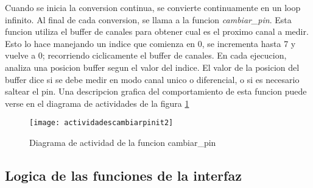 Cuando se inicia la conversion continua, se convierte continuamente en un loop infinito. Al final de cada conversion, se llama a la funcion \textit{cambiar\_pin}. Esta funcion utiliza el buffer de canales para obtener cual es el proximo canal a medir. Esto lo hace manejando un indice que comienza en 0, se incrementa hasta 7 y vuelve a 0; recorriendo ciclicamente el buffer de canales. 
En cada ejecucion, analiza una posicion buffer segun el valor del indice. El valor de la posicion del buffer dice si se debe medir en modo canal unico o diferencial, o si es necesario saltear el pin. Una descripcion grafica del comportamiento de esta funcion puede verse en el diagrama de actividades de la figura \ref{fig:actividadescambiarpinit2} \\


\begin{figure}[h]
  \centering
  \texttt{[image: actividadescambiarpinit2]}
  \caption{Diagrama de actividad de la funcion cambiar\_pin}\label{fig:actividadescambiarpinit2}
\end{figure}




\subsection{Logica de las funciones de la interfaz} %
\label{it2:sub:logica_de_las_funciones_de_la_interfaz}

